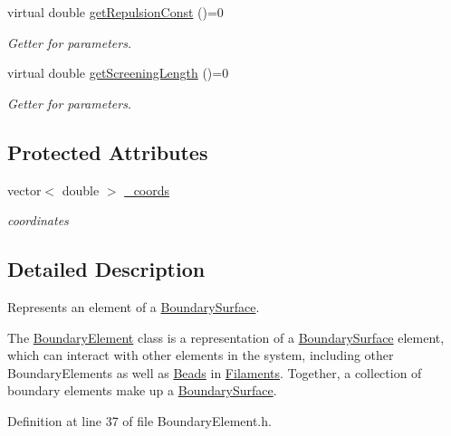 {\bf }\par
\begin{DoxyCompactItemize}
\item 
virtual double \hyperlink{classBoundaryElement_aff96a5a1faa7df9b30899d9c3de84f4a}{get\+Repulsion\+Const} ()=0
\begin{DoxyCompactList}\small\item\em Getter for parameters. \end{DoxyCompactList}\item 
virtual double \hyperlink{classBoundaryElement_a075dff05ab75cfd8be7f1a731030045a}{get\+Screening\+Length} ()=0
\begin{DoxyCompactList}\small\item\em Getter for parameters. \end{DoxyCompactList}\end{DoxyCompactItemize}

\subsection*{Protected Attributes}
\begin{DoxyCompactItemize}
\item 
vector$<$ double $>$ \hyperlink{classBoundaryElement_ab51302e10e3e2def98438234ba5bf801}{\+\_\+coords}
\begin{DoxyCompactList}\small\item\em coordinates \end{DoxyCompactList}\end{DoxyCompactItemize}


\subsection{Detailed Description}
Represents an element of a \hyperlink{classBoundarySurface}{Boundary\+Surface}. 

The \hyperlink{classBoundaryElement}{Boundary\+Element} class is a representation of a \hyperlink{classBoundarySurface}{Boundary\+Surface} element, which can interact with other elements in the system, including other Boundary\+Elements as well as \hyperlink{classBead}{Beads} in \hyperlink{classFilament}{Filaments}. Together, a collection of boundary elements make up a \hyperlink{classBoundarySurface}{Boundary\+Surface}. 

Definition at line 37 of file Boundary\+Element.\+h.



